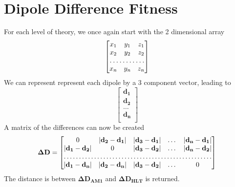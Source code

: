 \documentclass[12pt]{article}
\begin{document}
\section{Dipole Difference Fitness}
For each level of theory, we once again start with the 2 dimensional array
\[
\begin{bmatrix}
  x_{1} & y_{1} & z_{1} \\
  x_{2} & y_{2} & z_{2} \\
  \hdotsfor{3}   \\
  x_n & y_n & z_n
\end{bmatrix}
\]
We can represent represent each dipole by a 3 component vector, leading to
\[
  \begin{bmatrix}
   \mathbf{d_1} \\
   \mathbf{d_2} \\
   \dots        \\
   \mathbf{d_n} \\
  \end{bmatrix}
\]
A matrix of the differences can now be created
\begin{equation}
  \mathbf{\Delta D}=
  \begin{bmatrix}
    0 & | \mathbf{d_2} - \mathbf{d_1} | & | \mathbf{d_3} - \mathbf{d_1} |  & \dots & | \mathbf{d_n} - \mathbf{d_1} | \\
    | \mathbf{d_1} - \mathbf{d_2} | & 0 & | \mathbf{d_3} - \mathbf{d_2} |  & \dots & | \mathbf{d_n} - \mathbf{d_2} | \\
    \hdotsfor{5} \\
    | \mathbf{d_1} - \mathbf{d_n} | &  | \mathbf{d_2} - \mathbf{d_n} | & | \mathbf{d_3} - \mathbf{d_2} |  & \dots & 0 
  \end{bmatrix}
\end{equation}
The distance is between $\mathbf{\Delta D_{AM1}}$ and $\mathbf{\Delta D_{HLT}}$ is returned.
\end{document}
